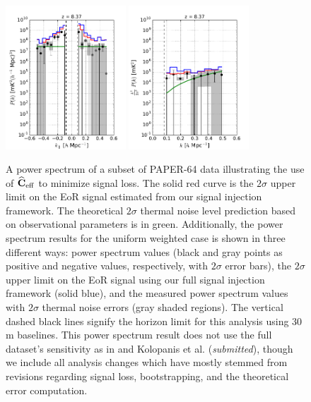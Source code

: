 \documentclass[preprint2,numberedappendix,tighten]{aastex6}  %
\begin{document}
\begin{figure}
	\centering
	\includegraphics[width=0.4\textwidth]{plots/ps1_data_add.pdf}
	\includegraphics[width=0.4\textwidth]{plots/ps2_data_add.pdf}
	\caption{A power spectrum of a subset of PAPER-64 data illustrating the use of $\widehat{\textbf{C}}_{\rm eff}$ to minimize signal loss. The solid red curve is the $2\sigma$ upper limit on the EoR signal estimated from our signal injection framework. The theoretical $2\sigma$ thermal noise level prediction based on observational parameters is in green. Additionally, the power spectrum results for the uniform weighted case is shown in three different ways: power spectrum values (black and gray points as positive and negative values, respectively, with $2\sigma$ error bars), the $2\sigma$ upper limit on the EoR signal using our full signal injection framework (solid blue), and the measured power spectrum values with $2\sigma$ thermal noise errors (gray shaded regions). The vertical dashed black lines signify the horizon limit for this analysis using $30$\,m baselines. This power spectrum result does not use the full dataset's sensitivity as in  and Kolopanis et al. (\textit{submitted}), though we include all analysis changes which have mostly stemmed from revisions regarding signal 
loss, bootstrapping, and the theoretical error computation.}
	\label{fig:ps1_data}
\end{figure}
\end{document}
